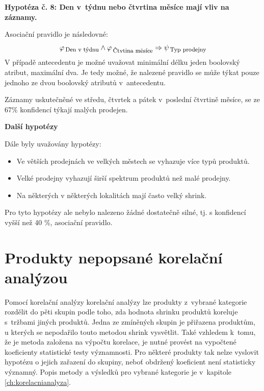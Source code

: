 \vspace*{1em}

\textbf{Hypotéza č. 8: Den v~týdnu nebo čtvrtina měsíce mají vliv na záznamy.}

Asociační pravidlo je následovné:
\begin{equation}
    \varphi_{\mbox{\,\footnotesize Den v~týdnu}} \land  \varphi_{\mbox{\,\footnotesize Čtvtina měsíce}} \Rightarrow \psi_{\mbox{\,\footnotesize Typ prodejny}}
\end{equation} 
V případě antecedentu je možné uvažovat minimální délku jeden boolovský atribut, maximální dva. Je tedy možné, že nalezené pravidlo se může týkat pouze jednoho ze dvou boolovský atributů v~antecedentu.

Záznamy uskutečněné ve středu, čtvrtek a pátek v~poslední čtvrtině měsíce, se ze 67\% konfidencí týkají malých prodejen.

\textbf{Další hypotézy}

Dále byly uvažovány hypotézy:
\begin{itemize}
    \itemsep 0em
    \item Ve větších prodejnách ve velkých městech se vyhazuje více typů produktů.
    \item Velké prodejny vyhazují širší spektrum produktů než malé prodejny.
    \item Na některých v některých lokalitách mají často velký shrink.
\end{itemize}

Pro tyto hypotézy ale nebylo nalezeno žádné dostatečně silné, tj. s konfidencí vyšší než 40 \%, asociační pravidlo.

\section{Produkty nepopsané korelační analýzou}

Pomocí korelační analýzy korelační analýzy lze produkty z~vybrané kategorie rozdělit do pěti skupin podle toho, zda hodnota shrinku produktů koreluje s~tržbami jiných produktů. Jedna ze zmíněných skupin je přiřazena produktům, u kterých se nepodařilo touto metodou shrink vysvětlit. Také vzhledem k~tomu, že je metoda založena na výpočtu korelace, je nutné provést na vypočtené koeficienty statistické testy významnosti. Pro některé produkty tak nelze vyslovit hypotézu o jejich zařazení do skupiny, neboť obdržený koeficient není statisticky významný. Popis metody a výsledků pro vybrané kategorie je v~kapitole \ref*{ch:korelacnianalyza}.

